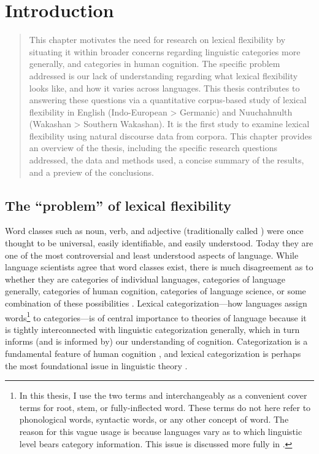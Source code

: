 \chapter{Introduction}
\label{ch:introduction}

\blockquote{This chapter motivates the need for research on lexical flexibility by situating it within broader concerns regarding linguistic categories more generally, and categories in human cognition. The specific problem addressed is our lack of understanding regarding what lexical flexibility looks like, and how it varies across languages. This thesis contributes to answering these questions via a quantitative corpus-based study of lexical flexibility in English (Indo-European > Germanic) and Nuuchahnulth (Wakashan > Southern Wakashan). It is the first study to examine lexical flexibility using natural discourse data from corpora. This chapter provides an overview of the thesis, including the specific research questions addressed, the data and methods used, a concise summary of the results, and a preview of the conclusions.}

\section{The \enquote{problem} of lexical flexibility}
\label{sec:1.1}

Word classes such as noun, verb, and adjective (traditionally called ) were once thought to be universal, easily identifiable, and easily understood. Today they are one of the most controversial and least understood aspects of language. While language scientists agree that word classes exist, there is much disagreement as to whether they are categories of individual languages, categories of language generally, categories of human cognition, categories of language science, or some combination of these possibilities \parencites[166]{Mithun2017}{Haspelmath2018}{Hieberforthcoming}. Lexical categorization—how languages assign words\footnote{In this thesis, I use the two terms  and  interchangeably as a convenient cover terms for root, stem, or fully-inflected word. These terms do not here refer to phonological words, syntactic words, or any other concept of word. The reason for this vague usage is because languages vary as to which linguistic level bears category information. This issue is discussed more fully in .} to categories—is of central importance to theories of language because it is tightly interconnected with linguistic categorization generally, which in turn informs (and is informed by) our understanding of cognition. Categorization is a fundamental feature of human cognition \parencites[xi]{Taylor2003}[2--3]{LierRijkhoff2013}, and lexical categorization is perhaps the most foundational issue in linguistic theory \parencites[36]{Croft1991}[1]{VapnarskyVeneziano2017}.

